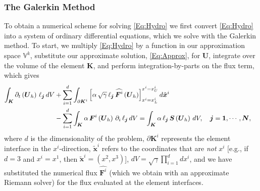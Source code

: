 \documentclass[letterpaper]{jpconf}
\renewcommand{\bs}[1]{\boldsymbol{#1}}
\begin{document}
 \subsubsection{The Galerkin Method}
 To obtain a numerical scheme for solving \eqref{Eq:Hydro} we first convert \eqref{Eq:Hydro} into a system of ordinary differential equations, which we solve with the Galerkin method. To start, we multiply \eqref{Eq:Hydro} by a function in our approximation space $\mathbb{V}^{k}$, substitute our approximate solution, \eqref{Eq:Approx}, for $\bs{U}$, integrate over the volume of the element $\bs{K}$, and perform integration-by-parts on the flux term, which gives
 \begin{align}\label{Eq:WeakForm1}
     \int_{\bs{K}}\partial_{t}\left(\bs{U}_{h}\right)\,\ell_{\bs{j}}\,dV&+\sum\limits_{i=1}^{d}\int_{\partial\bs{K}^{i}}\left[\alpha\,\sqrt{\gamma}\,\ell_{\bs{j}}\,\widehat{\bs{F}^{i}}\left(\bs{U}_{h}\right)\right]^{x^{i}=x^{i}_{U}}_{x^{i}=x^{i}_{L}}d\tilde{\bs{x}}^{i}&\notag\\
     &-\sum\limits_{i=1}^{d}\int_{\bs{K}}\alpha\,\bs{F}^{i}\left(\bs{U}_{h}\right)\,\partial_{i}\,\ell_{\bs{j}}\,dV=\int_{\bs{K}}\alpha\,\ell_{\bs{j}}\,\bs{S}\left(\bs{U}_{h}\right)\,dV,\hspace{1em}\bs{j}=\bs{1},\cdots,\bs{N},
 \end{align}
where $d$ is the dimensionality of the problem, $\partial\boldsymbol{K}^{i}$ represents the element interface in the $x^{i}$-direction, $\tilde{\bs{x}}^{i}$ refers to the coordinates that are \textit{not} $x^{i}$ [e.g., if $d=3$ and $x^{i}=x^{1}$, then $\tilde{\bs{x}}^{i}=\left(x^{2},x^{3}\right)$], $dV=\sqrt{\gamma}\prod_{i=1}^{d}dx^{i}$, and we have substituted the numerical flux $\widehat{\bs{F}^{i}}$ (which we obtain with an approximate Riemann solver) for the flux evaluated at the element interfaces.
\end{document}
